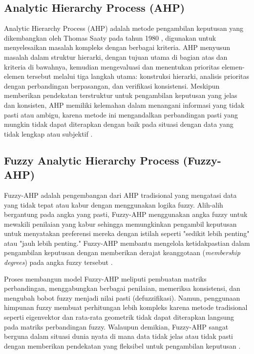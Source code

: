 \documentclass[journal,article,submit,pdftex,moreauthors]{Definitions/mdpi}
\begin{document}
\subsection{Analytic Hierarchy Process (AHP)}

Analytic Hierarchy Process (AHP) adalah metode pengambilan keputusan yang dikembangkan oleh Thomas Saaty pada tahun 1980 \cite{Saaty}, digunakan untuk menyelesaikan masalah kompleks dengan berbagai kriteria. AHP menyusun masalah dalam struktur hierarki, dengan tujuan utama di bagian atas dan kriteria di bawahnya, kemudian mengevaluasi dan menentukan prioritas elemen-elemen tersebut melalui tiga langkah utama: konstruksi hierarki, analisis prioritas dengan perbandingan berpasangan, dan verifikasi konsistensi. Meskipun memberikan pendekatan terstruktur untuk pengambilan keputusan yang jelas dan konsisten, AHP memiliki kelemahan dalam menangani informasi yang tidak pasti atau ambigu, karena metode ini mengandalkan perbandingan pasti yang mungkin tidak dapat diterapkan dengan baik pada situasi dengan data yang tidak lengkap atau subjektif \cite{fahpbook}.


\subsection{Fuzzy Analytic Hierarchy Process (Fuzzy-AHP)}

Fuzzy-AHP adalah pengembangan dari AHP tradisional yang mengatasi data yang tidak tepat atau kabur dengan menggunakan logika fuzzy. Alih-alih bergantung pada angka yang pasti, Fuzzy-AHP menggunakan angka fuzzy untuk mewakili penilaian yang kabur sehingga memungkinkan pengambil keputusan untuk menyatakan preferensi mereka dengan istilah seperti "sedikit lebih penting" atau "jauh lebih penting." Fuzzy-AHP membantu mengelola ketidakpastian dalam pengambilan keputusan dengan memberikan derajat keanggotaan (\textit{membership degrees}) pada angka fuzzy tersebut \cite{liu-fahp}.

Proses membangun model Fuzzy-AHP meliputi pembuatan matriks perbandingan, menggabungkan berbagai penilaian, memeriksa konsistensi, dan mengubah bobot fuzzy menjadi nilai pasti (defuzzifikasi). Namun, penggunaan himpunan fuzzy membuat perhitungan lebih kompleks karena metode tradisional seperti eigenvektor dan rata-rata geometrik tidak dapat diterapkan langsung pada matriks perbandingan fuzzy. Walaupun demikian, Fuzzy-AHP sangat berguna dalam situasi dunia nyata di mana data tidak jelas atau tidak pasti dengan memberikan pendekatan yang fleksibel untuk pengambilan keputusan \cite{liu-fahp}.
\end{document}
